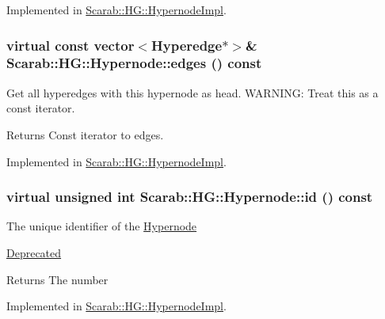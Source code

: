 Implemented in \hyperlink{classScarab_1_1HG_1_1HypernodeImpl_a328189f28a4185d435035686a27592c2}{Scarab::HG::HypernodeImpl}.

\hypertarget{classScarab_1_1HG_1_1Hypernode_a3306572ded5b5061c1916bcf268be94e}{
\subsubsection[{edges}]{\setlength{\rightskip}{0pt plus 5cm}virtual const vector$<${\bf Hyperedge}$\ast$$>$\& Scarab::HG::Hypernode::edges () const}}
\label{classScarab_1_1HG_1_1Hypernode_a3306572ded5b5061c1916bcf268be94e}
Get all hyperedges with this hypernode as head. WARNING: Treat this as a const iterator. \begin{DoxyReturn}{Returns}
Const iterator to edges. 
\end{DoxyReturn}


Implemented in \hyperlink{classScarab_1_1HG_1_1HypernodeImpl_ada979dcddc1bf0abf0fc2530d1ea8761}{Scarab::HG::HypernodeImpl}.

\hypertarget{classScarab_1_1HG_1_1Hypernode_a0aeaee6c2ca2a011fcd086f803aaa4d0}{
\subsubsection[{id}]{\setlength{\rightskip}{0pt plus 5cm}virtual unsigned int Scarab::HG::Hypernode::id () const}}
\label{classScarab_1_1HG_1_1Hypernode_a0aeaee6c2ca2a011fcd086f803aaa4d0}
The unique identifier of the \hyperlink{classScarab_1_1HG_1_1Hypernode}{Hypernode} \begin{Desc}
\item[\hyperlink{deprecated__deprecated000006}{Deprecated}]\end{Desc}
\begin{DoxyReturn}{Returns}
The number 
\end{DoxyReturn}


Implemented in \hyperlink{classScarab_1_1HG_1_1HypernodeImpl_a2579ef1e67ad8f51d23838c130440d21}{Scarab::HG::HypernodeImpl}.

